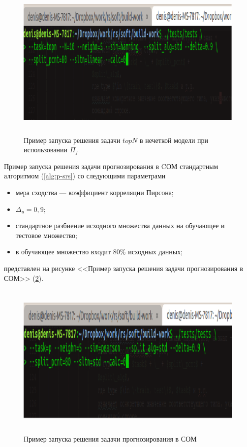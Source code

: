 \begin{figure}[H]
	\caption{Пример запуска решения задачи $topN$ в нечеткой модели при
	использовании $\Pi_f$}
	\label{pic:ex-topn-fuz}
	\begin{center}
	\includegraphics[width=7in,height=3in]{pics/examples/topn-fuz.png}
\end{center}
\end{figure}
Пример запуска решения задачи прогнозирования в CОМ стандартным
алгоритмом (\ref{alg:p-srs}) со следующими параметрами
\begin{itemize}
	\item мера сходства --- коэффициент корреляции Пирсона;
	\item $\Delta_u = 0,9$;
	\item стандартное разбиение исходного множества данных на обучающее и
		тестовое множество;
	\item в обучающее множество входит 80\% исходных данных;
\end{itemize}
представлен на рисунке <<Пример запуска решения задачи прогнозирования в СОМ>> (\ref{pic:ex-p-srs}).

\begin{figure}[H]
	\caption{Пример запуска решения задачи прогнозирования в СОМ}
	\label{pic:ex-p-srs}
	\begin{center}
  \includegraphics[width=7in,height=3in]{pics/examples/p-pearson.png}
\end{center}
\end{figure}

